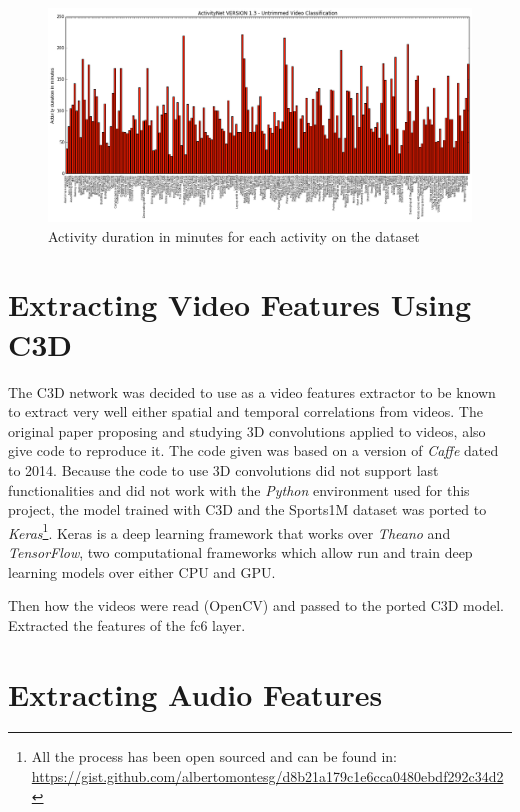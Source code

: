 \begin{figure}
\begin{center}
\includegraphics[width=1\linewidth]{img/methodology/dataset_stats}
\end{center}
\caption{Activity duration in minutes for each activity on the dataset}
\label{fig:dataset_stats}
\end{figure}

\section{Extracting Video Features Using C3D}

The C3D network\cite{tran2014learning} was decided to use as a video features extractor to be known to extract very well either spatial and temporal correlations from videos.
The original paper proposing and studying 3D convolutions applied to videos, also give code to reproduce it. The code given was based on a version of \textit{Caffe}\cite{jia2014caffe} dated to 2014. Because the code to use 3D convolutions did not support last functionalities and did not work with the \textit{Python} environment used for this project, the model trained with C3D and the Sports1M dataset was ported to \textit{Keras}\footnote{All the process has been open sourced and can be found in: \url{https://gist.github.com/albertomontesg/d8b21a179c1e6cca0480ebdf292c34d2}}. Keras is a deep learning framework that works over \textit{Theano}\cite{theano2016theano} and \textit{TensorFlow}\cite{abadi2016tensorflow}, two computational frameworks which allow run and train deep learning models over either CPU and GPU.



Then how the videos were read (OpenCV) and passed to the ported C3D model. Extracted the features of the fc6 layer.

\section{Extracting Audio Features}

